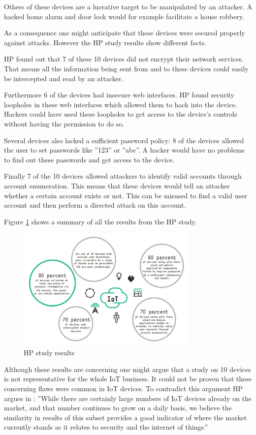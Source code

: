 \documentclass[conference]{IEEEtran}
\begin{document}
Others of these devices are a lucrative target to be manipulated by an 
attacker. A hacked home alarm and door lock would for example facilitate a 
house robbery. 

As a consequence one might anticipate that these devices were secured properly 
against attacks. However the HP study results show different facts.

HP found out that 7 of these 10 devices did not encrypt their network services. 
That means all the information being sent from and to these devices could easily
be intercepted and read by an attacker. 

Furthermore 6 of the devices had insecure web interfaces. HP found security 
loopholes in these web interfaces which allowed them to hack into the device. 
Hackers could have used these loopholes to get access to the device's controls 
without having the permission to do so. 

Several devices also lacked a sufficient password policy: 8 of the devices 
allowed the user to set passwords like ''123'' or ''abc''. A hacker would 
have no problems to find out these passwords and get access to the device.

Finally 7 of the 10 devices allowed attackers to identify valid accounts 
through account enumeration. This means that these devices would tell an 
attacker whether a certain account exists or not. This can be misused to find 
a valid user account and then perform a directed attack on this account. 

Figure \ref{HPStudyresults} shows a summary of all the results from the HP 
study.

\begin{figure}[!t]
\centering
\includegraphics[width=3.5in]{./img/hpStudy1.png}
\caption{HP study results}
\label{HPStudyresults}
\end{figure}

Although these results are concerning one might argue that a study on 10 
devices is not representative for the whole IoT business. It could not be 
proven that these concerning flaws were common in IoT devices. To contradict 
this argument HP argues in \cite[p. 6]{HPstudy}: ''While there are certainly 
large numbers of IoT devices already on the market, and that number continues 
to grow on a daily basis, we believe the similarity in results of this subset 
provides a good indicator of where the market currently stands as it relates to 
security and the internet of things.'' 
\end{document}
